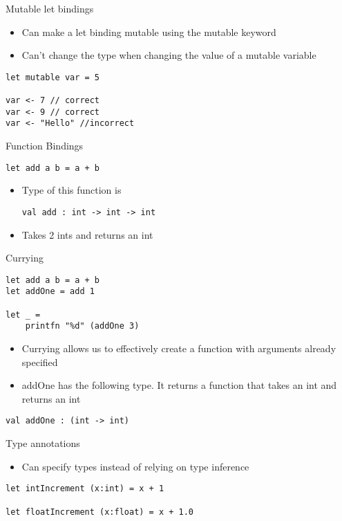 \documentclass[landscape]{slides}
\begin{document}
\begin{slide}{Mutable let bindings}
\begin{itemize}
\item Can make a let binding mutable using the mutable keyword 
\item Can't change the type when changing the value of a mutable variable
\end{itemize}
\begin{verbatim}
let mutable var = 5 

var <- 7 // correct
var <- 9 // correct
var <- "Hello" //incorrect
\end{verbatim}
\end{slide}

\begin{slide}{Function Bindings}
\begin{verbatim}
let add a b = a + b
\end{verbatim}
\begin{itemize}
\item Type of this function is
\begin{verbatim}
val add : int -> int -> int
\end{verbatim}
\item Takes 2 ints and returns an int
\end{itemize}
\end{slide}

\begin{slide}{Currying}
\begin{verbatim}
let add a b = a + b
let addOne = add 1

let _ =
    printfn "%d" (addOne 3)
\end{verbatim}
\begin{itemize}
\item Currying allows us to effectively create a function with arguments already specified
\item addOne has the following type. It returns a function that takes an int and returns an int
\end{itemize}
\begin{verbatim}
val addOne : (int -> int)
\end{verbatim}
\end{slide}

\begin{slide}{Type annotations}
\begin{itemize}
\item Can specify types instead of relying on type inference
\end{itemize}
\begin{verbatim}
let intIncrement (x:int) = x + 1

let floatIncrement (x:float) = x + 1.0
\end{verbatim}
\end{slide}
\end{document}

